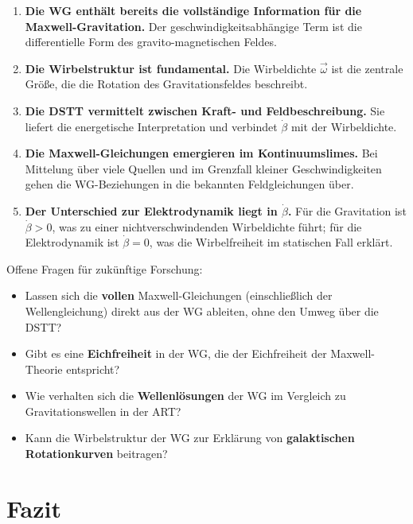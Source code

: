 \documentclass[12pt,a4paper]{article}
\begin{document}
\begin{enumerate}
    \item \textbf{Die WG enthält bereits die vollständige Information für die Maxwell-Gravitation.} Der geschwindigkeitsabhängige Term ist die differentielle Form des gravito-magnetischen Feldes.
    
    \item \textbf{Die Wirbelstruktur ist fundamental.} Die Wirbeldichte \(\vec{\omega}\) ist die zentrale Größe, die die Rotation des Gravitationsfeldes beschreibt.
    
    \item \textbf{Die DSTT vermittelt zwischen Kraft- und Feldbeschreibung.} Sie liefert die energetische Interpretation und verbindet \(\dot{\beta}\) mit der Wirbeldichte.
    
    \item \textbf{Die Maxwell-Gleichungen emergieren im Kontinuumslimes.} Bei Mittelung über viele Quellen und im Grenzfall kleiner Geschwindigkeiten gehen die WG-Beziehungen in die bekannten Feldgleichungen über.
    
    \item \textbf{Der Unterschied zur Elektrodynamik liegt in \(\dot{\beta}\).} Für die Gravitation ist \(\dot{\beta} > 0\), was zu einer nichtverschwindenden Wirbeldichte führt; für die Elektrodynamik ist \(\dot{\beta} = 0\), was die Wirbelfreiheit im statischen Fall erklärt.
\end{enumerate}

Offene Fragen für zukünftige Forschung:

\begin{itemize}
    \item Lassen sich die \textbf{vollen} Maxwell-Gleichungen (einschließlich der Wellengleichung) direkt aus der WG ableiten, ohne den Umweg über die DSTT?
    \item Gibt es eine \textbf{Eichfreiheit} in der WG, die der Eichfreiheit der Maxwell-Theorie entspricht?
    \item Wie verhalten sich die \textbf{Wellenlösungen} der WG im Vergleich zu Gravitationswellen in der ART?
    \item Kann die Wirbelstruktur der WG zur Erklärung von \textbf{galaktischen Rotationkurven} beitragen?
\end{itemize}

\section{Fazit}
\end{document}
